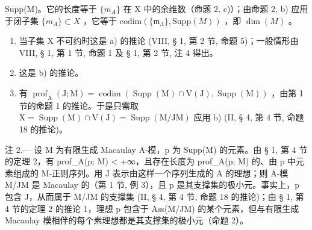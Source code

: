 Supp(M)。它的长度等于 \(\{m_{A}\}\) 在 X 中的余维数（命题 2, c)）；由命题 2, b) 应用于闭子集 \(\{m_{A}\}\subset X\) ，它等于 \(\text{codim}(\{\mathfrak{m}_{\Lambda}\},\text{Supp}(M))\) ，即 \(\dim(M)\) 。

\begin{enumerate}
\def\labelenumi{\alph{enumi})}
\setcounter{enumi}{1}
\item
  当子集 X 不可约时这是 a) 的推论 (VIII, § 1, 第 2 节, 命题 5)；一般情形由 VIII, § 1, 第 1 节, 命题 1 及 § 1, 第 2 节, 注 4 得出。
\item
  这是 b) 的推论。
\item
  有 \(\operatorname{prof}_{\mathrm{A}}(\mathrm{J};\mathrm{M}) = \operatorname{codim}(\operatorname{Supp}(\mathrm{M})\cap \mathrm{V}(\mathrm{J}),\operatorname{Supp}(\mathrm{M}))\) ，由第 1 节的命题 1 的推论。于是只需取 \(\mathrm{X} = \operatorname{Supp}(\mathrm{M})\cap \mathrm{V}(\mathrm{J}) = \operatorname{Supp}(\mathrm{M} / \mathrm{JM})\) 应用 b) (II, § 4, 第 4 节, 命题 18 的推论)。
\end{enumerate}

注 2.--- 设 M 为有限生成 Macaulay A-模，p 为 Supp(M) 的元素。由 § 1, 第 4 节的定理 2，有 prof\_A(p; M) \textless{} +∞，且存在长度为 prof\_A(p; M) 的、由 p 中元素组成的 M-正则序列。用 J 表示由这样一个序列生成的 A 的理想；则 A-模 M/JM 是 Macaulay 的（第 1 节, 例 3），且 p 是其支撑集的极小元。事实上，p 包含 J，从而属于 M/JM 的支撑集 (II, § 4, 第 4 节, 命题 18 的推论)；由 § 1, 第 4 节的定理 2 的推论 1，理想 p 包含于 Ass(M/JM) 的某个元素，但与有限生成 Macaulay 模相伴的每个素理想都是其支撑集的极小元（命题 2）。
